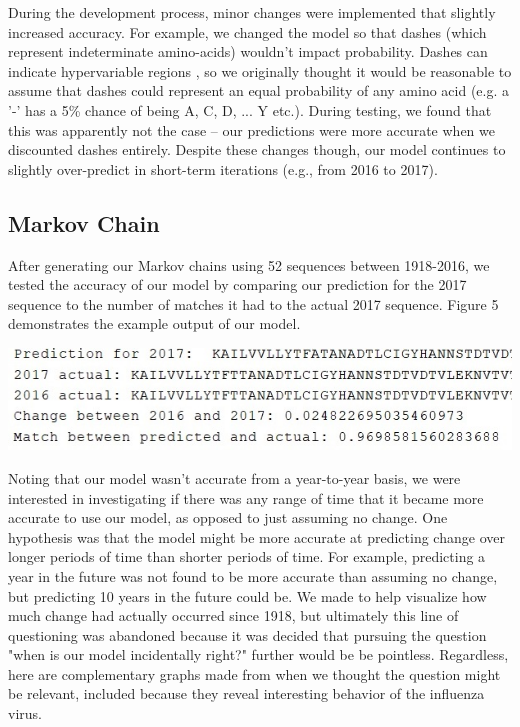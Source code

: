 \documentclass[12pt]{article}
\newenvironment{Figure}
  {\par\medskip\noindent\minipage{\linewidth}}
  {\endminipage\par\medskip}
\begin{document}
\begin{multicols}{2}
During the development process, minor changes were implemented that slightly increased accuracy. For example, we changed the model so that dashes (which represent indeterminate amino-acids) wouldn't impact probability. Dashes can indicate hypervariable regions \citep{harris2008single}, so we originally thought it would be reasonable to assume that dashes could represent an equal probability of any amino acid (e.g. a '-' has a 5\% chance of being A, C, D, ... Y etc.). During testing, we found that this was apparently not the case -- our predictions were more accurate when we discounted dashes entirely. Despite these changes though, our model continues to slightly over-predict in short-term iterations (e.g., from 2016 to 2017). 

\subsection{Markov Chain}
After generating our Markov chains using 52 sequences between 1918-2016, we tested the accuracy of our model by comparing our prediction for the 2017 sequence to the number of matches it had to the actual 2017 sequence. Figure 5 demonstrates the example output of our model.

\begin{Figure}
 \centering
 \includegraphics[width=\linewidth]{prediction1.jpg}
\end{Figure}

Noting that our model wasn't accurate from a year-to-year basis, we were interested in investigating if there was any range of time that it became more accurate to use our model, as opposed to just assuming no change. One hypothesis was that the model might be more accurate at predicting change over longer periods of time than shorter periods of time. For example, predicting a year in the future was not found to be more accurate than assuming no change, but predicting 10 years in the future could be. We made to help visualize how much change had actually occurred since 1918, but ultimately this line of questioning was abandoned because it was decided that pursuing the question "when is our model incidentally right?" further would be be pointless. Regardless, here are complementary graphs made from when we thought the question might be relevant, included because they reveal interesting behavior of the influenza virus. 


\end{multicols}
\end{document}
